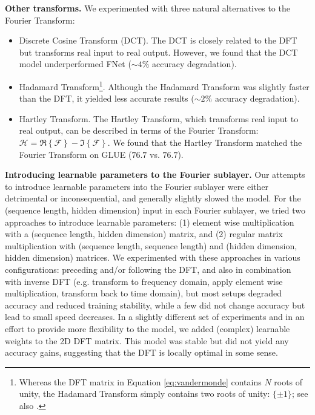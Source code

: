 \documentclass[11pt]{article}
\begin{document}
\textbf{Other transforms.} We experimented with three natural alternatives to the Fourier Transform:
\begin{itemize}
    \item Discrete Cosine Transform (DCT). The DCT is closely related to the DFT but transforms real input to real output. However, we found that the DCT model underperformed FNet ($\sim4\%$ accuracy degradation).
    \item Hadamard Transform\footnote{Whereas the DFT matrix in Equation \eqref{eq:vandermonde} contains $N$ roots of unity, the Hadamard Transform simply contains two roots of unity: $\{\pm1\}$; see also \citet{kunz1979equivalence}.}. Although the Hadamard Transform was slightly faster than the DFT, it yielded less accurate results ($\sim2\%$ accuracy degradation).
    \item Hartley Transform. The Hartley Transform, which transforms real input to real output, can be described in terms of the Fourier Transform: $\mathcal{H} = \Re\left\{\mathcal{F}\right\} - \Im\left\{\mathcal{F}\right\}$. We found that the Hartley Transform matched the Fourier Transform on GLUE ($76.7$ vs. $76.7$). 
\end{itemize}

\textbf{Introducing learnable parameters to the Fourier sublayer.} Our attempts to introduce learnable parameters into the Fourier sublayer were either detrimental or inconsequential, and generally slightly slowed the model. For the (sequence length, hidden dimension) input in each Fourier sublayer, we tried two approaches to introduce learnable parameters: (1) element wise multiplication with a (sequence length, hidden dimension) matrix, and (2) regular matrix multiplication with (sequence length, sequence length) and (hidden dimension, hidden dimension) matrices. We experimented with these approaches in various configurations: preceding and/or following the DFT, and also in combination with inverse DFT (e.g. transform to frequency domain, apply element wise multiplication, transform back to time domain), but most setups degraded accuracy and reduced training stability, while a few did not change accuracy but lead to small speed decreases. In a slightly different set of experiments and in an effort to provide more flexibility to the model, we added (complex) learnable weights to the 2D DFT matrix. This model was stable but did not yield any accuracy gains, suggesting that the DFT is locally optimal in some sense.
\end{document}
